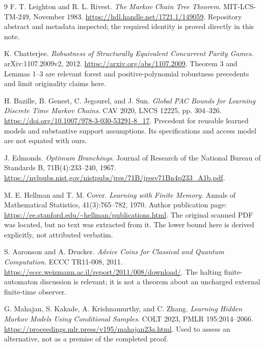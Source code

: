\documentclass[11pt]{article}
\begin{document}
\begin{thebibliography}{9}
F. T. Leighton and R. L. Rivest.
\emph{The Markov Chain Tree Theorem}. MIT-LCS-TM-249, November 1983.
\url{https://hdl.handle.net/1721.1/149059}.
Repository abstract and metadata inspected; the required identity is
proved directly in this note.

K. Chatterjee.
\emph{Robustness of Structurally Equivalent Concurrent Parity Games}.
arXiv:1107.2009v2, 2012.
\url{https://arxiv.org/abs/1107.2009}.
Theorem 3 and Lemmas 1--3 are relevant forest and positive-polynomial
robustness precedents and limit originality claims here.

H. Bazille, B. Genest, C. Jegourel, and J. Sun.
\emph{Global PAC Bounds for Learning Discrete Time Markov Chains}.
CAV 2020, LNCS 12225, pp. 304--326.
\url{https://doi.org/10.1007/978-3-030-53291-8_17}.
Precedent for reusable learned models and substantive support
assumptions. Its specifications and access model are not equated with ours.

J. Edmonds. \emph{Optimum Branchings}.
Journal of Research of the National Bureau of Standards B,
71B(4):233--240, 1967.
\url{https://nvlpubs.nist.gov/nistpubs/jres/71B/jresv71Bn4p233_A1b.pdf}.

M. E. Hellman and T. M. Cover.
\emph{Learning with Finite Memory}.
Annals of Mathematical Statistics, 41(3):765--782, 1970.
Author publication page:
\url{https://ee.stanford.edu/~hellman/publications.html}.
The original scanned PDF was located, but no text was extracted from it.
The lower bound here is derived explicitly, not attributed verbatim.

S. Aaronson and A. Drucker.
\emph{Advice Coins for Classical and Quantum Computation}.
ECCC TR11-008, 2011.
\url{https://eccc.weizmann.ac.il/report/2011/008/download/}.
The halting finite-automaton discussion is relevant; it is not a theorem
about an uncharged external finite-time observer.

G. Mahajan, S. Kakade, A. Krishnamurthy, and C. Zhang.
\emph{Learning Hidden Markov Models Using Conditional Samples}.
COLT 2023, PMLR 195:2014--2066.
\url{https://proceedings.mlr.press/v195/mahajan23a.html}.
Used to assess an alternative, not as a premise of the completed proof.
\end{thebibliography}
\end{document}
